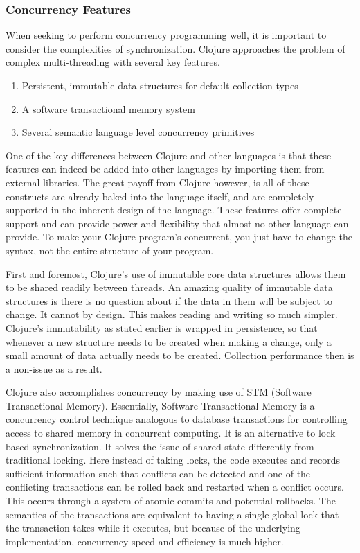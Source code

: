 \subsubsection{Concurrency Features}

    When seeking to perform concurrency programming well, it is important to consider the complexities of synchronization. Clojure approaches the problem of complex multi-threading with several key features.
    
    \begin{enumerate}
        \item Persistent, immutable data structures for default collection types
        \item A software transactional memory system
        \item Several semantic language level concurrency primitives
    \end{enumerate}
    
    One of the key differences between Clojure and other languages is that these features can indeed be added into other languages by importing them from external libraries. The great payoff from Clojure however, is all of these constructs are already baked into the language itself, and are completely supported in the inherent design of the language. These features offer complete support and can provide power and flexibility that almost no other language can provide. To make your Clojure program's concurrent, you just have to change the syntax, not the entire structure of your program.
    
    First and foremost, Clojure's use of immutable core data structures allows them to be shared readily between threads. An amazing quality of immutable data structures is there is no question about if the data in them will be subject to change. It cannot by design. This makes reading and writing so much simpler. Clojure's immutability as stated earlier is wrapped in persistence, so that  whenever a new structure needs to be created when making a change, only a small amount of data actually needs to be created. Collection performance then is a non-issue as a result.
    
    Clojure also accomplishes concurrency by making use of STM (Software Transactional Memory). Essentially, Software Transactional Memory is a concurrency control technique analogous to database transactions for controlling access to shared memory in concurrent computing. It is an alternative to lock based synchronization. It solves the issue of shared state differently from traditional locking. Here instead of taking locks, the code executes and records sufficient information such that conflicts can be detected and one of the conflicting transactions can be rolled back and restarted when a conflict occurs. This occurs through a system of atomic commits and potential rollbacks. The semantics of the transactions are equivalent to having a single global lock that the transaction takes while it executes, but because of the underlying implementation, concurrency speed and efficiency is much higher. \cite{Extending_STM_JournalArticle_Jensen}
    \cite{MUTS_SoftwareTransactionalMemory_JournalArticle_Goodman}
    

